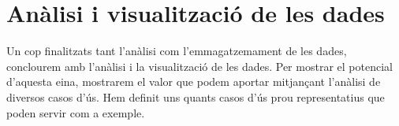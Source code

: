\chapter{Anàlisi i visualització de les dades}\label{ch:log-analysis}

Un cop finalitzats tant l’anàlisi com l’emmagatzemament de les dades, conclourem amb l’anàlisi i la visualització de les dades.
Per mostrar el potencial d’aquesta eina, mostrarem el valor que podem aportar mitjançant l’anàlisi de diversos casos d’ús.
Hem definit uns quants casos d’ús prou representatius que poden servir com a exemple.

\noindent \\

\clearpage
